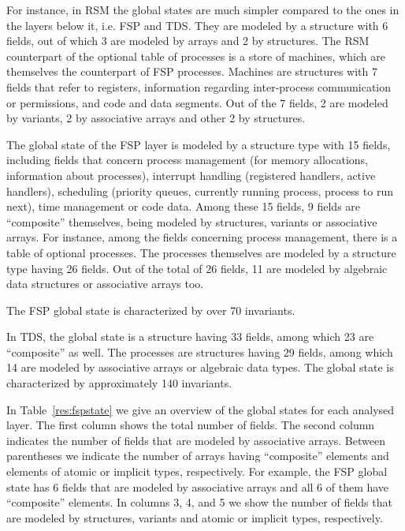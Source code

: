 \documentclass[11pt]{article}
\begin{document}
For instance, in RSM the global states are much simpler compared to the ones in the layers
below it, i.e. FSP and TDS. They are
modeled by a structure with 6 fields, out of which 3 are modeled by arrays and 2
by structures. The RSM counterpart of the optional table of processes is a store
of machines, which are themselves the counterpart of FSP processes. Machines are
structures with 7 fields that refer to registers, information regarding 
inter-process communication or permissions, and code and data segments. Out of the 
7 fields, 2 are modeled by variants, 2 by associative arrays and other 2 by
structures. 

The global state of the FSP layer is modeled by a structure type with
15 fields, including fields that concern process management (for memory allocations,
information about processes), interrupt handling (registered handlers, active handlers),
scheduling (priority queues, currently running process, process to run next), time
management or code data. Among these 15 fields, 9 fields are ``composite'' themselves, being  
modeled by structures, variants or associative arrays. For instance, among the fields 
concerning process management, there is a table of optional processes. The processes 
themselves are modeled by a structure type having 26 fields. Out of the total of 26 
fields, 11 are modeled by algebraic data structures or associative arrays too. 

The FSP global state is characterized by over 70 invariants. %
 

In TDS, the global state is a structure having 33 fields, among which 23 are 
``composite'' as well. The processes are structures having 29 fields, among which
14 are modeled by associative arrays or algebraic data types. The global state
is characterized by approximately 140 invariants.

In Table~\ref{res:fspstate} we give an overview of the global states for each
analysed layer. The first column shows the total number of fields. The second
column indicates the number of fields that are modeled by associative arrays.
Between parentheses we indicate the number of arrays having ``composite'' elements
and elements of atomic or implicit types, respectively. For example, the FSP global
state has 6 fields that are modeled by associative arrays and all 6 of them have
``composite'' elements. In columns 3, 4, and 5 we show the number of fields that
are modeled by structures, variants and atomic or implicit types, respectively.  
\end{document}
